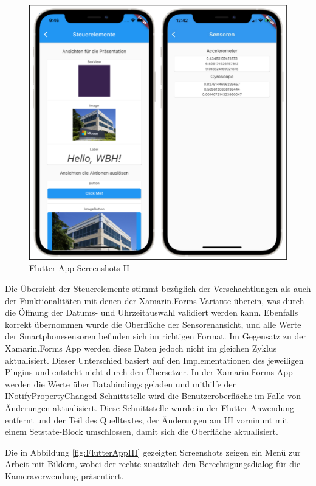 \begin{figure}[!ht]
 \includegraphics[width=\textwidth,keepaspectratio]{Images/Screenshot/Flutter2ios.png}
 \caption{Flutter App Screenshots II}
 \label{fig:FlutterAppII}
\end{figure}
Die Übersicht der Steuerelemente stimmt  bezüglich der Verschachtlungen als auch der Funktionalitäten mit denen der Xamarin.Forms Variante überein,  was durch die Öffnung der Datums- und Uhrzeitauswahl validiert werden kann.  Ebenfalls korrekt übernommen wurde die Oberfläche der Sensorenansicht,  und alle Werte der Smartphonesensoren befinden sich im richtigen Format. Im Gegensatz zu der Xamarin.Forms App werden diese Daten jedoch nicht im gleichen Zyklus aktualisiert.  Dieser Unterschied basiert auf den Implementationen des jeweiligen Plugins und entsteht nicht durch den Übersetzer.  In der Xamarin.Forms App werden die Werte über Databindings geladen und mithilfe der INotifyPropertyChanged Schnittstelle wird die Benutzeroberfläche im Falle von Änderungen aktualisiert.  Diese Schnittstelle wurde in der Flutter Anwendung entfernt und der Teil des Quelltextes,  der Änderungen am UI vornimmt mit einem Setstate-Block umschlossen,  damit sich die Oberfläche aktualisiert.  

Die in Abbildung \ref{fig:FlutterAppIII}  gezeigten Screenshots zeigen ein Menü zur Arbeit mit Bildern, wobei der rechte zusätzlich den Berechtigungsdialog für die Kameraverwendung präsentiert. 
  
